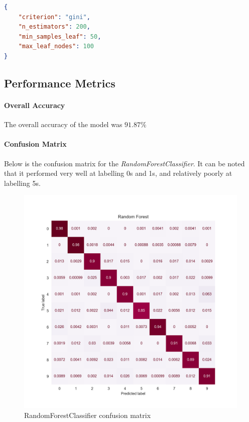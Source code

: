 \begin{lstlisting}[language=json]
{
    "criterion": "gini",
    "n_estimators": 200,
    "min_samples_leaf": 50,
    "max_leaf_nodes": 100
}
\end{lstlisting}

\subsection{Performance Metrics}

\paragraph{Overall Accuracy} The overall accuracy of the model was $91.87\%$

\paragraph{Confusion Matrix} Below is the confusion matrix for the \textit{RandomForestClassifier}. It can be noted that it performed very well at labelling 0s and 1s, and relatively poorly at labelling 5s.

\begin{figure}[h]
    \centering
    \includegraphics[scale=0.65]{images/exp-results/rf/rf_conf-matrix.png}
    \caption{RandomForestClassifier confusion matrix}
    \label{fig:exp_res_rf_conf_mat}
\end{figure}


